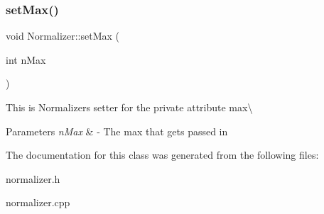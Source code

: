 \subsubsection{\texorpdfstring{set\+Max()}{setMax()}}
{\footnotesize\ttfamily void Normalizer\+::set\+Max (\begin{DoxyParamCaption}\item[{int}]{n\+Max }\end{DoxyParamCaption})}

This is Normalizers setter for the private attribute max\textbackslash{} 
\begin{DoxyParams}{Parameters}
{\em n\+Max} & -\/ The max that gets passed in \\
\hline
\end{DoxyParams}


The documentation for this class was generated from the following files\+:\begin{DoxyCompactItemize}
\item 
normalizer.\+h\item 
normalizer.\+cpp\end{DoxyCompactItemize}
